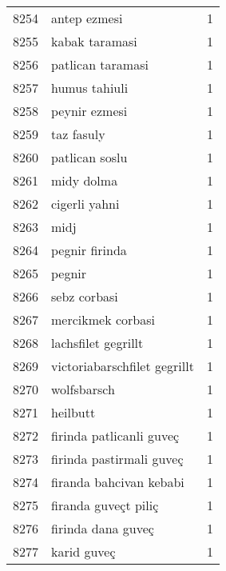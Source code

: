 \begin{tabular}{llr}
8254 &                                       antep ezmesi &      1 \\
8255 &                                     kabak taramasi &      1 \\
8256 &                                  patlican taramasi &      1 \\
8257 &                                      humus tahiuli &      1 \\
8258 &                                      peynir ezmesi &      1 \\
8259 &                                         taz fasuly &      1 \\
8260 &                                     patlican soslu &      1 \\
8261 &                                         midy dolma &      1 \\
8262 &                                      cigerli yahni &      1 \\
8263 &                                               midj &      1 \\
8264 &                                     pegnir firinda &      1 \\
8265 &                                             pegnir &      1 \\
8266 &                                       sebz corbasi &      1 \\
8267 &                                  mercikmek corbasi &      1 \\
8268 &                                lachsfilet gegrillt &      1 \\
8269 &                       victoriabarschfilet gegrillt &      1 \\
8270 &                                        wolfsbarsch &      1 \\
8271 &                                           heilbutt &      1 \\
8272 &                           firinda patlicanli guveç &      1 \\
8273 &                           firinda pastirmali guveç &      1 \\
8274 &                            firanda bahcivan kebabi &      1 \\
8275 &                               firanda guveçt piliç &      1 \\
8276 &                                 firinda dana guveç &      1 \\
8277 &                                        karid guveç &      1 \\

\end{tabular}

